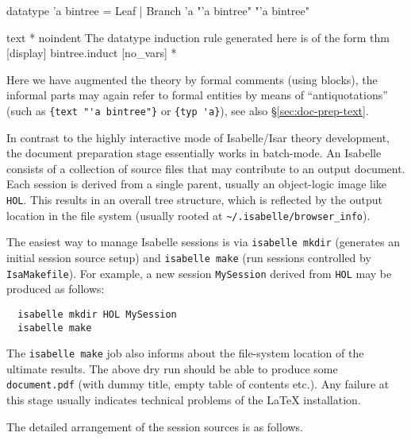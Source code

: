 \begin{isabellebody}
\begin{isamarkuptext}
\begin{ttbox}
  datatype 'a bintree =
    Leaf | Branch 'a  "'a bintree"  "'a bintree"
  \end{ttbox}
  \begin{ttbox}
  text {\ttlbrace}*
    {\ttback}noindent The datatype induction rule generated here is
    of the form {\at}{\ttlbrace}thm [display] bintree.induct [no_vars]{\ttrbrace}
  *{\ttrbrace}
  \end{ttbox}\vspace{-\medskipamount}

  \noindent Here we have augmented the theory by formal comments
  (using  blocks), the informal parts may again refer
  to formal entities by means of ``antiquotations'' (such as
  \texttt{\at}\verb,{text "'a bintree"}, or
  \texttt{\at}\verb,{typ 'a},), see also \S\ref{sec:doc-prep-text}.%
\end{isamarkuptext}%
\isamarkuptrue%
%
\isamarkuptrue%
%
\begin{isamarkuptext}%
In contrast to the highly interactive mode of Isabelle/Isar theory
  development, the document preparation stage essentially works in
  batch-mode.  An Isabelle  consists of a collection
  of source files that may contribute to an output document.  Each
  session is derived from a single parent, usually an object-logic
  image like \texttt{HOL}.  This results in an overall tree structure,
  which is reflected by the output location in the file system
  (usually rooted at \verb,~/.isabelle/browser_info,).

  \medskip The easiest way to manage Isabelle sessions is via
  \texttt{isabelle mkdir} (generates an initial session source setup)
  and \texttt{isabelle make} (run sessions controlled by
  \texttt{IsaMakefile}).  For example, a new session
  \texttt{MySession} derived from \texttt{HOL} may be produced as
  follows:

\begin{verbatim}
  isabelle mkdir HOL MySession
  isabelle make
\end{verbatim}

  The \texttt{isabelle make} job also informs about the file-system
  location of the ultimate results.  The above dry run should be able
  to produce some \texttt{document.pdf} (with dummy title, empty table
  of contents etc.).  Any failure at this stage usually indicates
  technical problems of the {\LaTeX} installation.

  \medskip The detailed arrangement of the session sources is as
  follows.


\end{isamarkuptext}
\end{isabellebody}
